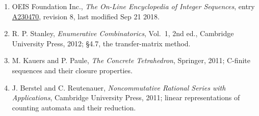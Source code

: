 \documentclass[11pt]{article}
\theoremstyle{definition}
\begin{document}
\begin{enumerate}

\item OEIS Foundation Inc., \emph{The On-Line Encyclopedia of Integer Sequences}, entry \href{https://oeis.org/A230470}{A230470}, revision 8, last modified Sep 21 2018.

\item R. P. Stanley, \emph{Enumerative Combinatorics}, Vol.~1, 2nd ed., Cambridge University Press, 2012; \S4.7, the transfer-matrix method.

\item M. Kauers and P. Paule, \emph{The Concrete Tetrahedron}, Springer, 2011; C-finite sequences and their closure properties.

\item J. Berstel and C. Reutenauer, \emph{Noncommutative Rational Series with Applications}, Cambridge University Press, 2011; linear representations of counting automata and their reduction.

\end{enumerate}
\end{document}
